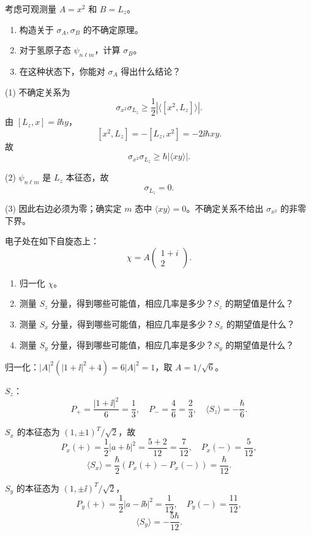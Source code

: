 \begin{question}
考虑可观测量 $A=x^2$ 和 $B=L_z$。
\begin{enumerate}
\item 构造关于 $\sigma_A,\sigma_B$ 的不确定原理。
\item 对于氢原子态 $\psi_{n\ell m}$，计算 $\sigma_B$。
\item 在这种状态下，你能对 $\sigma_A$ 得出什么结论？
\end{enumerate}
\end{question}
\begin{solution}

(1) 不确定关系为
\[
\sigma_{x^2}\sigma_{L_z}\ge\frac12|\langle[x^2,L_z]\rangle|.
\]
由 $[L_z,x]=\ii\hbar y$，
\[
[x^2,L_z]=-[L_z,x^2]=-2\ii\hbar xy.
\]
故
\[
\sigma_{x^2}\sigma_{L_z}\ge \hbar|\langle xy\rangle|.
\]

(2) $\psi_{n\ell m}$ 是 $L_z$ 本征态，故
\[
\sigma_{L_z}=0.
\]

(3) 因此右边必须为零；确实定 $m$ 态中 $\langle xy\rangle=0$。不确定关系不给出 $\sigma_{x^2}$ 的非零下界。

\end{solution}

\begin{question}
电子处在如下自旋态上：
\[
\chi=A\begin{pmatrix}1+i\\2\end{pmatrix}.
\]
\begin{enumerate}
\item 归一化 $\chi$。
\item 测量 $S_z$ 分量，得到哪些可能值，相应几率是多少？$S_z$ 的期望值是什么？
\item 测量 $S_x$ 分量，得到哪些可能值，相应几率是多少？$S_x$ 的期望值是什么？
\item 测量 $S_y$ 分量，得到哪些可能值，相应几率是多少？$S_y$ 的期望值是什么？
\end{enumerate}
\end{question}
\begin{solution}

归一化：$|A|^2(|1+
\ii|^2+4)=6|A|^2=1$，取 $A=1/\sqrt6$。

$S_z$：
\[
P_+=\frac{|1+\ii|^2}{6}=\frac13,
\quad P_-=\frac{4}{6}=\frac23,
\quad \langle S_z\rangle=-\frac\hbar6.
\]

$S_x$ 的本征态为 $(1,\pm1)^T/\sqrt2$，故
\[
P_x(+)=\frac12|a+b|^2=\frac{5+2}{12}=\frac7{12},
\quad P_x(-)=\frac5{12},
\]
\[
\langle S_x\rangle=\frac\hbar2(P_x(+)-P_x(-))=\frac\hbar{12}.
\]

$S_y$ 的本征态为 $(1,\pm\ii)^T/\sqrt2$，
\[
P_y(+)=\frac12|a-\ii b|^2=\frac{1}{12},
\quad P_y(-)=\frac{11}{12},
\]
\[
\langle S_y\rangle=-\frac{5\hbar}{12}.
\]

\end{solution}

